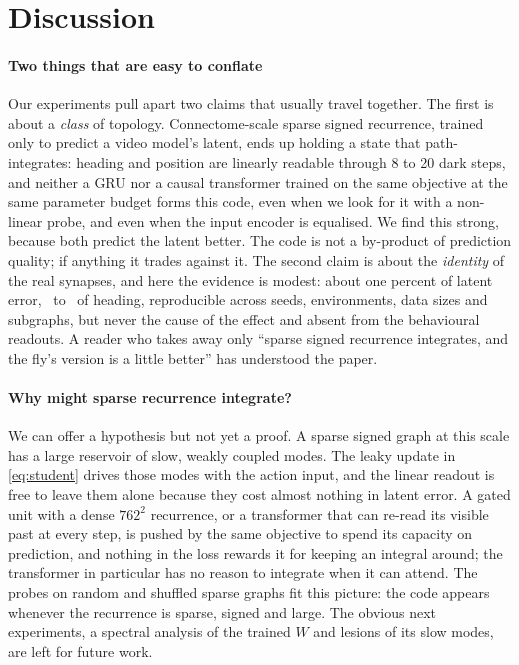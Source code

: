 \section{Discussion}
\label{sec:discussion}

\paragraph{Two things that are easy to conflate}
Our experiments pull apart two claims that usually travel together. The first is about a \emph{class} of topology.
Connectome-scale sparse signed recurrence, trained only to predict a video model's latent, ends up holding a state
that path-integrates: heading and position are linearly readable through 8 to 20 dark steps, and neither a GRU nor a
causal transformer trained on the same objective at the same parameter budget forms this code, even when we look for
it with a non-linear probe, and even when the input encoder is equalised. We find this strong, because both predict the
latent better. The code is not a by-product of prediction quality;
if anything it trades against it. The second claim is about the \emph{identity} of the real synapses, and here the
evidence is modest: about one percent of latent error, \nConnBlockGapArena\ to \nConnBlockGapArenaDarkSixteen\degree\ of heading, reproducible across seeds,
environments, data sizes and subgraphs, but never the cause of the effect and absent from the behavioural readouts.
A reader who takes away only ``sparse signed recurrence integrates, and the fly's version is a little better'' has
understood the paper.

\paragraph{Why might sparse recurrence integrate?}
We can offer a hypothesis but not yet a proof. A sparse signed graph at this scale has a large reservoir of slow,
weakly coupled modes. The leaky update in \cref{eq:student} drives those modes with the action input, and the linear
readout is free to leave them alone because they cost almost nothing in latent error. A gated unit with a dense
$762^2$ recurrence, or a transformer that can re-read its visible past at every step, is pushed by the same objective
to spend its capacity on prediction, and nothing in the loss rewards it for keeping an integral around; the transformer
in particular has no reason to integrate when it can attend. The probes on random and shuffled sparse graphs fit this picture: the
code appears whenever the recurrence is sparse, signed and large. The obvious next experiments, a spectral analysis
of the trained $W$ and lesions of its slow modes, are left for future work.


